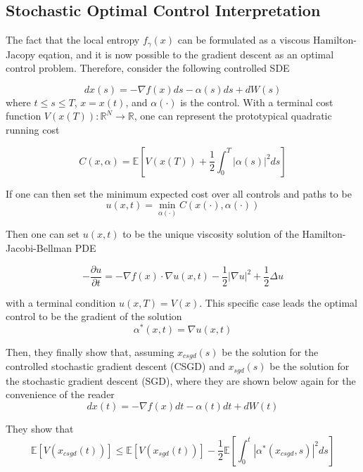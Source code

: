 \subsection{Stochastic Optimal Control Interpretation}
The fact that the local entropy $f_\gamma(x)$ can be formulated as a viscous Hamilton-Jacopy eqation, and it is now possible to the gradient descent as an optimal control problem. Therefore, consider the following controlled SDE

\begin{equation}
dx(s) = - \nabla f(x) ds - \alpha(s) ds + dW(s) \tag{CSGD}
\end{equation}
where $t \leq s \leq T$, $x=x(t)$, and $\alpha(\cdot)$ is the control. With a terminal cost function $V(x(T)) : \mathbb{R}^N \rightarrow \mathbb{R}$, one can represent the prototypical quadratic running cost

$$C(x,\alpha) = \mathbb{E} \left[ V(x(T)) + \frac{1}{2} \int_0^T |\alpha(s)|^2 ds \right]$$

If one can then set the minimum expected cost over all controls and paths to be
$$ u(x,t) = \min_{\alpha(\cdot)} C(x(\cdot),\alpha(\cdot))$$

Then one can set $u(x,t)$ to be the unique viscosity solution of the Hamilton-Jacobi-Bellman PDE

$$-\frac{\partial u}{\partial t} = -\nabla f(x) \cdot \nabla u(x,t) - \frac{1}{2} |\nabla u|^2 + \frac{1}{2} \Delta u$$

with a terminal condition $u(x,T) = V(x)$. This specific case leads the optimal control to be the gradient of the solution $$\alpha^*(x,t) = \nabla u(x,t)$$

Then, they finally show that, assuming $x_{csgd}(s)$ be the solution for the controlled stochastic gradient descent (CSGD) and $x_{sgd}(s)$ be the solution for the stochastic gradient descent (SGD), where they are shown below again for the convenience of the reader
\begin{equation}
    dx(t) = - \nabla f(x) dt - \alpha(t) dt + dW(t) \tag{CSGD}
\end{equation}

They show that
\begin{equation*}
    \mathbb{E}[V(x_{csgd}(t))] \leq \mathbb{E}[V(x_{sgd}(t))] - \frac{1}{2} \mathbb{E} \left[ \int^t _0 |\alpha^*(x_{csgd},s)|^2 ds \right]
\end{equation*}

